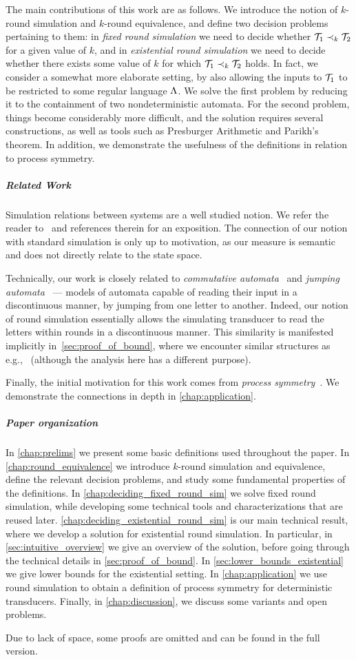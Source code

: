The main contributions of this work are as follows. We introduce the notion of $k$-round simulation and $k$-round equivalence, and define two decision problems pertaining to them: in \emph{fixed round simulation} we need to decide whether $\mathcal{T}_1\prec_k \mathcal{T}_2$ for a given value of $k$, and in \emph{existential round simulation} we need to decide whether there exists some value of $k$ for which $\mathcal{T}_1\prec_k \mathcal{T}_2$ holds. In fact, we consider a somewhat more elaborate setting, by also allowing the inputs to $\mathcal{T}_1$ to be restricted to some regular language $\Lambda$.
We solve the first problem by reducing it to the containment of two nondeterministic automata. For the second problem, things become considerably more difficult, and the solution requires several constructions, as well as tools such as Presburger Arithmetic and Parikh's theorem. 
In addition, we demonstrate the usefulness of the definitions in relation to process symmetry.

\subparagraph*{Related Work} Simulation relations between systems are a well studied notion. We refer the reader to~\cite[Chapter 13]{Clarke2018a} and references therein for an exposition. The connection of our notion with standard simulation is only up to motivation, as our measure is semantic and does not directly relate to the state space.

Technically, our work is closely related to \emph{commutative automata}~\cite{Brzozowski1973} and \emph{jumping automata}~\cite{Fernau2015,Meduna2012} --- models of automata capable of reading their input in a discontinuous manner, by jumping from one letter to another. Indeed, our notion of round simulation essentially allows the simulating transducer to read the letters within rounds in a discontinuous manner. This similarity is manifested implicitly in~\autoref{sec:proof_of_bound}, where we encounter similar structures as e.g.,~\cite{Hoffmann2020} (although the analysis here has a different purpose).

Finally, the initial motivation for this work comes from \emph{process symmetry}~\cite{Almagor2020b,Clarke1996,Emerson1996,Ip1996,Lin2016}. We demonstrate the connections in depth in \autoref{chap:application}.

\subparagraph*{Paper organization}
In \autoref{chap:prelims} we present some basic definitions used throughout the paper. In \autoref{chap:round_equivalence} we introduce $k$-round simulation and equivalence, define the relevant decision problems, and study some fundamental properties of the definitions. In \autoref{chap:deciding_fixed_round_sim} we solve fixed round simulation, while developing some technical tools and characterizations that are reused later. \autoref{chap:deciding_existential_round_sim} is our main technical result, where we develop a solution for existential round simulation. In particular, in \autoref{sec:intuitive_overview} we give an overview of the solution, before going through the technical details in \autoref{sec:proof_of_bound}. In \autoref{sec:lower_bounds_existential} we give lower bounds for the existential setting.
In \autoref{chap:application} we use round simulation to obtain a definition of process symmetry for deterministic transducers. Finally, in \autoref{chap:discussion}, we discuss some variants and open problems.

Due to lack of space, some proofs are omitted and can be found in the full version.


